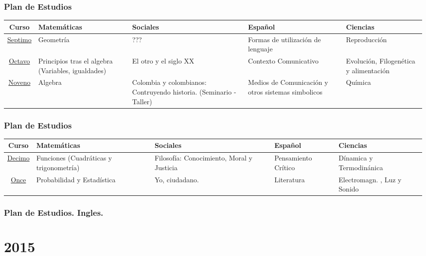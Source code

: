 \documentclass{beamer}
\begin{document}
\begin{frame}
\fontsize{9pt}{10}\selectfont
\frametitle{Plan de Estudios}
\begin{table}
\centering
\begin{tabular}{|c|p{2cm}|p{2cm}|p{2cm}|p{2cm}|}
\hline 
\textbf{Curso} & \textbf{Matem\'aticas} &\textbf{Sociales} &\textbf{Espa\~nol} & \textbf{Ciencias}\\
\hline
\underline{Septimo} & Geometr\'ia & ??? & Formas de utilizaci\'on de lenguaje & Reproducci\'on \\
\underline{Octavo} & Principios tras el algebra (Variables, igualdades)  &El otro y el siglo XX & Contexto Comunicativo  & Evoluci\'on, Filogen\'etica y  alimentaci\'on \\
\underline{Noveno} & Algebra & Colombia y colombianos: Contruyendo historia. (Seminario - Taller)  & Medios de Comunicaci\'on y otros  sistemas simbolicos & Qu\'imica \\
\hline 
\end{tabular}
\end{table}
\end{frame}
\begin{frame}
\fontsize{9pt}{10}\selectfont
\frametitle{Plan de Estudios}
\begin{table}
\centering
\begin{tabular}{|c|p{2cm}|p{2cm}|p{2cm}|p{2cm}|}
\hline 
\textbf{Curso} & \textbf{Matem\'aticas} &\textbf{Sociales} &\textbf{Espa\~nol} & \textbf{Ciencias}\\
\hline
\underline{Decimo} & Funciones (Cuadr\'aticas y trigonometr\'ia)  & Filosof\'ia: Conocimiento, Moral y Justicia & Pensamiento Cr\'itico & D\'inamica y Termodin\'anica\\
\underline{Once} & Probabilidad y Estad\'istica & Yo, ciudadano. & Literatura & Electromagn. , Luz y Sonido \\
\hline 
\end{tabular}
\end{table}
\end{frame}

\begin{frame}
\fontsize{9pt}{10}\selectfont
\frametitle{Plan de Estudios. Ingles.}
\begin{center}
\end{center}
\end{frame}
\section{2015}
\end{document}
